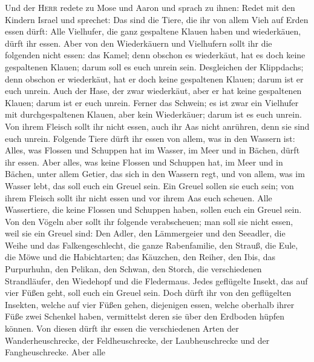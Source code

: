  Und der \textsc{Herr} redete zu Mose und Aaron und sprach
zu ihnen:  Redet mit den Kindern Israel und sprechet: Das
sind die Tiere, die ihr von allem Vieh auf Erden essen dürft:
 Alle Vielhufer, die ganz gespaltene Klauen haben und
wiederkäuen, dürft ihr essen.  Aber von den Wiederkäuern
und Vielhufern sollt ihr die folgenden nicht essen: das Kamel; denn
obschon es wiederkäut, hat es doch keine gespaltenen Klauen; darum soll
es euch unrein sein.  Desgleichen der Klippdachs; denn
obschon er wiederkäut, hat er doch keine gespaltenen Klauen; darum ist
er euch unrein.  Auch der Hase, der zwar wiederkäut, aber
er hat keine gespaltenen Klauen; darum ist er euch unrein.
 Ferner das Schwein; es ist zwar ein Vielhufer mit
durchgespaltenen Klauen, aber kein Wiederkäuer; darum ist es euch
unrein.  Von ihrem Fleisch sollt ihr nicht essen, auch ihr
Aas nicht anrühren, denn sie sind euch unrein.  Folgende
Tiere dürft ihr essen von allem, was in den Wassern ist: Alles, was
Flossen und Schuppen hat im Wasser, im Meer und in Bächen, dürft ihr
essen.  Aber alles, was keine Flossen und Schuppen hat,
im Meer und in Bächen, unter allem Getier, das sich in den Wassern regt,
und von allem, was im Wasser lebt, das soll euch ein Greuel sein.
 Ein Greuel sollen sie euch sein; von ihrem Fleisch sollt
ihr nicht essen und vor ihrem Aas euch scheuen.  Alle
Wassertiere, die keine Flossen und Schuppen haben, sollen euch ein
Greuel sein.  Von den Vögeln aber sollt ihr folgende
verabscheuen; man soll sie nicht essen, weil sie ein Greuel sind: Den
Adler, den Lämmergeier und den Seeadler,  die Weihe und
das Falkengeschlecht,  die ganze Rabenfamilie,
 den Strauß, die Eule, die Möwe und die Habichtarten;
 das Käuzchen, den Reiher, den Ibis,  das
Purpurhuhn, den Pelikan, den Schwan,  den Storch, die
verschiedenen Strandläufer, den Wiedehopf und die Fledermaus.
 Jedes geflügelte Insekt, das auf vier Füßen geht, soll
euch ein Greuel sein.  Doch dürft ihr von den geflügelten
Insekten, welche auf vier Füßen gehen, diejenigen essen, welche oberhalb
ihrer Füße zwei Schenkel haben, vermittelst deren sie über den Erdboden
hüpfen können.  Von diesen dürft ihr essen die
verschiedenen Arten der Wanderheuschrecke, der Feldheuschrecke, der
Laubheuschrecke und der Fangheuschrecke.  Aber alle
